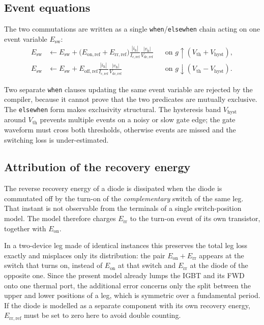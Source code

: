 \documentclass[11pt,a4paper]{article}
\newcommand{\code}[1]{\texttt{\small #1}}
\begin{document}
\subsection{Event equations}

The two commutations are written as a single \code{when}/\code{elsewhen} chain
acting on one event variable $E_\mathrm{sw}$:
\begin{align}
  E_\mathrm{sw} &\leftarrow E_\mathrm{sw}
    + \bigl(E_\mathrm{on,ref} + E_\mathrm{rr,ref}\bigr)
      \frac{|i_\mathrm{h}|}{I_\mathrm{c,ref}}
      \frac{|v_\mathrm{h}|}{V_\mathrm{dc,ref}}
    && \text{on } g \uparrow (V_\mathrm{th} + V_\mathrm{hyst}),\\
  E_\mathrm{sw} &\leftarrow E_\mathrm{sw}
    + E_\mathrm{off,ref}
      \frac{|i_\mathrm{h}|}{I_\mathrm{c,ref}}
      \frac{|v_\mathrm{h}|}{V_\mathrm{dc,ref}}
    && \text{on } g \downarrow (V_\mathrm{th} - V_\mathrm{hyst}).
\end{align}

Two separate \code{when} clauses updating the same event variable are rejected
by the compiler, because it cannot prove that the two predicates are mutually
exclusive. The \code{elsewhen} form makes exclusivity structural. The hysteresis
band $V_\mathrm{hyst}$ around $V_\mathrm{th}$ prevents multiple events on a noisy
or slow gate edge; the gate waveform must cross both thresholds, otherwise
events are missed and the switching loss is under-estimated.

\subsection{Attribution of the recovery energy}

The reverse recovery energy of a diode is dissipated when the diode is
commutated off by the turn-on of the \emph{complementary} switch of the same
leg. That instant is not observable from the terminals of a single
switch-position model. The model therefore charges $E_\mathrm{rr}$ to the
turn-on event of its own transistor, together with $E_\mathrm{on}$.

In a two-device leg made of identical instances this preserves the total leg
loss exactly and misplaces only its distribution: the pair
$E_\mathrm{on} + E_\mathrm{rr}$ appears at the switch that turns on, instead of
$E_\mathrm{on}$ at that switch and $E_\mathrm{rr}$ at the diode of the opposite
one. Since the present model already lumps the IGBT and its FWD onto one thermal
port, the additional error concerns only the split between the upper and lower
positions of a leg, which is symmetric over a fundamental period. If the diode
is modelled as a separate component with its own recovery energy,
$E_\mathrm{rr,ref}$ must be set to zero here to avoid double counting.
\end{document}
